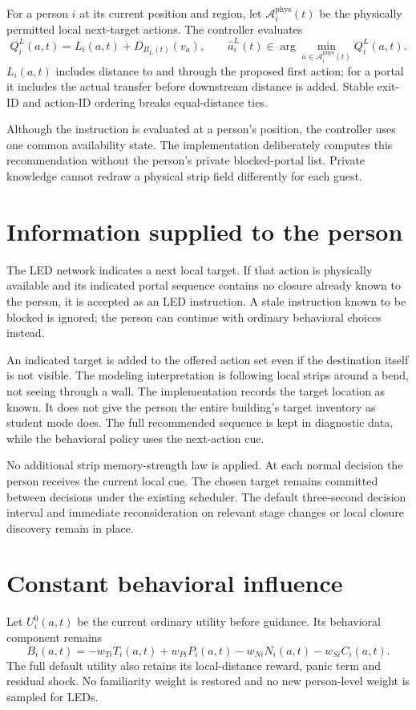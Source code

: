 \documentclass[11pt]{article}
\begin{document}
For a person $i$ at its current position and region, let
$\mathcal A_i^{\mathrm{phys}}(t)$ be the physically permitted local next-target
actions. The controller evaluates
\[
 Q_i^L(a,t)=L_i(a,t)+D_{B_L(t)}(v_a),\qquad
 \widehat a_i^L(t)\in\arg\min_{a\in\mathcal A_i^{\mathrm{phys}}(t)}Q_i^L(a,t).
\]
$L_i(a,t)$ includes distance to and through the proposed first action; for a
portal it includes the actual transfer before downstream distance is added.
Stable exit-ID and action-ID ordering breaks equal-distance ties.

Although the instruction is evaluated at a person's position, the controller
uses one common availability state. The implementation deliberately computes
this recommendation without the person's private blocked-portal list. Private
knowledge cannot redraw a physical strip field differently for each guest.

\section{Information supplied to the person}
The LED network indicates a next local target. If that action is physically
available and its indicated portal sequence contains no closure already known
to the person, it is accepted as an LED instruction. A stale instruction known
to be blocked is ignored; the person can continue with ordinary behavioral
choices instead.

An indicated target is added to the offered action set even if the destination
itself is not visible. The modeling interpretation is following local strips
around a bend, not seeing through a wall. The implementation records the
target location as known. It does not give the person the entire building's
target inventory as student mode does. The full recommended sequence is kept
in diagnostic data, while the behavioral policy uses the next-action cue.

No additional strip memory-strength law is applied. At each normal decision
the person receives the current local cue. The chosen target remains committed
between decisions under the existing scheduler. The default three-second
decision interval and immediate reconsideration on relevant stage changes or
local closure discovery remain in place.

\section{Constant behavioral influence}
Let $U_i^0(a,t)$ be the current ordinary utility before guidance. Its behavioral
component remains
\[
 B_i(a,t)=-w_{Ti}T_i(a,t)+w_{Pi}P_i(a,t)
                         -w_{Ni}N_i(a,t)-w_{Si}C_i(a,t).
\]
The full default utility also retains its local-distance reward, panic term
and residual shock. No familiarity weight is restored and no new person-level
weight is sampled for LEDs.
\end{document}
